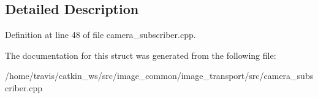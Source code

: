 \subsection{Detailed Description}


Definition at line 48 of file camera\-\_\-subscriber.\-cpp.



The documentation for this struct was generated from the following file\-:\begin{DoxyCompactItemize}
\item 
/home/travis/catkin\-\_\-ws/src/image\-\_\-common/image\-\_\-transport/src/camera\-\_\-subscriber.\-cpp\end{DoxyCompactItemize}

